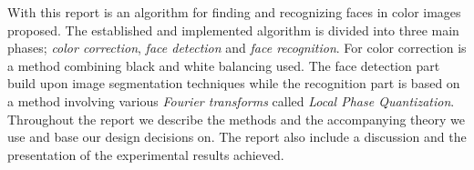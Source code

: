 With this report is an algorithm for finding and recognizing faces in color images proposed. The established and implemented algorithm is divided into three main phases; \textit{color correction}, \textit{face detection} and \textit{face recognition}. For color correction is a method combining black and white balancing used. The face detection part build upon image segmentation techniques while the recognition part is based on a method involving various \textit{Fourier transforms} called \textit{Local Phase Quantization}. Throughout the report we describe the methods and the accompanying theory we use and base our design decisions on. The report also include a discussion and the presentation of the experimental results achieved. 
